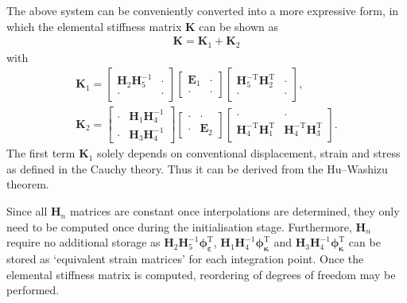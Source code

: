 \documentclass[3p,sort&compress,11pt,fleqn]{elsarticle}
\newcommand*{\mT}{\mathrm{T}}
\begin{document}
The above system can be conveniently converted into a more expressive form, in which the elemental stiffness matrix $\mathbold{K}$ can be shown as
\begin{gather}\label{eq:stiffness}
\mathbold{K}=\mathbold{K}_1+\mathbold{K}_2
\end{gather}
with
\begin{gather}
\mathbold{K}_1=\begin{bmatrix}
\mathbold{H}_2\mathbold{H}_5^{-1}&\cdot\\\cdot&\cdot
\end{bmatrix}\begin{bmatrix}
\mathbold{E}_1&\cdot\\\cdot&\cdot
\end{bmatrix}\begin{bmatrix}
\mathbold{H}_5^{-\mT}\mathbold{H}_2^\mT&\cdot\\\cdot&\cdot
\end{bmatrix},\\
\mathbold{K}_2=\begin{bmatrix}
\cdot&\mathbold{H}_1\mathbold{H}_4^{-1}\\\cdot&\mathbold{H}_3\mathbold{H}_4^{-1}
\end{bmatrix}\begin{bmatrix}
\cdot&\cdot\\\cdot&\mathbold{E}_2
\end{bmatrix}\begin{bmatrix}
\cdot&\cdot\\\mathbold{H}_4^{-\mT}\mathbold{H}_1^\mT&\mathbold{H}_4^{-\mT}\mathbold{H}_3^\mT
\end{bmatrix}.
\end{gather}
The first term $\mathbold{K}_1$ solely depends on conventional displacement, strain and stress as defined in the Cauchy theory. Thus it can be derived from the Hu--Washizu theorem.

Since all $\mathbold{H}_n$ matrices are constant once interpolations are determined, they only need to be computed once during the initialisation stage. Furthermore, $\mathbold{H}_n$ require no additional storage as $\mathbold{H}_2\mathbold{H}_5^{-1}\mathbold{\phi}_\mathbold{\varepsilon}^\mT$, $\mathbold{H}_1\mathbold{H}_4^{-1}\mathbold{\phi}_\mathbold{\kappa}^\mT$ and $\mathbold{H}_3\mathbold{H}_4^{-1}\mathbold{\phi}_\mathbold{\kappa}^\mT$ can be stored as `equivalent strain matrices' for each integration point. Once the elemental stiffness matrix is computed, reordering of degrees of freedom may be performed.
\end{document}
